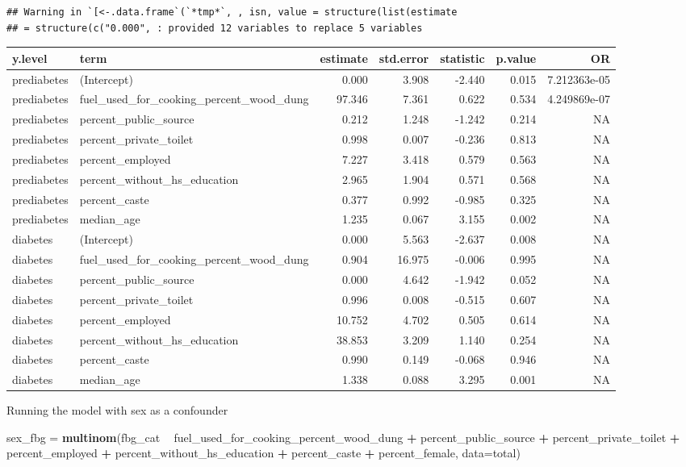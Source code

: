 \documentclass[]{article}
\newenvironment{Shaded}{\begin{snugshade}}{\end{snugshade}}
\newcommand{\DataTypeTok}[1]{\textcolor[rgb]{0.13,0.29,0.53}{#1}}
\newcommand{\KeywordTok}[1]{\textcolor[rgb]{0.13,0.29,0.53}{\textbf{#1}}}
\newcommand{\NormalTok}[1]{#1}
\newcommand{\OperatorTok}[1]{\textcolor[rgb]{0.81,0.36,0.00}{\textbf{#1}}}
\newcommand{\StringTok}[1]{\textcolor[rgb]{0.31,0.60,0.02}{#1}}
\begin{document}
\begin{verbatim}
## Warning in `[<-.data.frame`(`*tmp*`, , isn, value = structure(list(estimate
## = structure(c("0.000", : provided 12 variables to replace 5 variables
\end{verbatim}

\begin{longtable}[]{@{}llrrrrr@{}}
\toprule
y.level & term & estimate & std.error & statistic & p.value &
OR\tabularnewline
\midrule
\endhead
prediabetes & (Intercept) & 0.000 & 3.908 & -2.440 & 0.015 &
7.212363e-05\tabularnewline
prediabetes & fuel\_used\_for\_cooking\_percent\_wood\_dung & 97.346 &
7.361 & 0.622 & 0.534 & 4.249869e-07\tabularnewline
prediabetes & percent\_public\_source & 0.212 & 1.248 & -1.242 & 0.214 &
NA\tabularnewline
prediabetes & percent\_private\_toilet & 0.998 & 0.007 & -0.236 & 0.813
& NA\tabularnewline
prediabetes & percent\_employed & 7.227 & 3.418 & 0.579 & 0.563 &
NA\tabularnewline
prediabetes & percent\_without\_hs\_education & 2.965 & 1.904 & 0.571 &
0.568 & NA\tabularnewline
prediabetes & percent\_caste & 0.377 & 0.992 & -0.985 & 0.325 &
NA\tabularnewline
prediabetes & median\_age & 1.235 & 0.067 & 3.155 & 0.002 &
NA\tabularnewline
diabetes & (Intercept) & 0.000 & 5.563 & -2.637 & 0.008 &
NA\tabularnewline
diabetes & fuel\_used\_for\_cooking\_percent\_wood\_dung & 0.904 &
16.975 & -0.006 & 0.995 & NA\tabularnewline
diabetes & percent\_public\_source & 0.000 & 4.642 & -1.942 & 0.052 &
NA\tabularnewline
diabetes & percent\_private\_toilet & 0.996 & 0.008 & -0.515 & 0.607 &
NA\tabularnewline
diabetes & percent\_employed & 10.752 & 4.702 & 0.505 & 0.614 &
NA\tabularnewline
diabetes & percent\_without\_hs\_education & 38.853 & 3.209 & 1.140 &
0.254 & NA\tabularnewline
diabetes & percent\_caste & 0.990 & 0.149 & -0.068 & 0.946 &
NA\tabularnewline
diabetes & median\_age & 1.338 & 0.088 & 3.295 & 0.001 &
NA\tabularnewline
\bottomrule
\end{longtable}

Running the model with sex as a confounder

\begin{Shaded}
\begin{Highlighting}[]
\NormalTok{sex_fbg =}\StringTok{ }
\StringTok{  }\KeywordTok{multinom}\NormalTok{(fbg_cat }\OperatorTok{~}\StringTok{ }\NormalTok{fuel_used_for_cooking_percent_wood_dung }\OperatorTok{+}\StringTok{ }\NormalTok{percent_public_source }\OperatorTok{+}\StringTok{ }\NormalTok{percent_private_toilet }\OperatorTok{+}\StringTok{ }\NormalTok{percent_employed }\OperatorTok{+}\StringTok{ }\NormalTok{percent_without_hs_education }\OperatorTok{+}\StringTok{ }\NormalTok{percent_caste }\OperatorTok{+}\StringTok{ }\NormalTok{percent_female, }\DataTypeTok{data=}\NormalTok{total)}
\end{Highlighting}
\end{Shaded}
\end{document}
